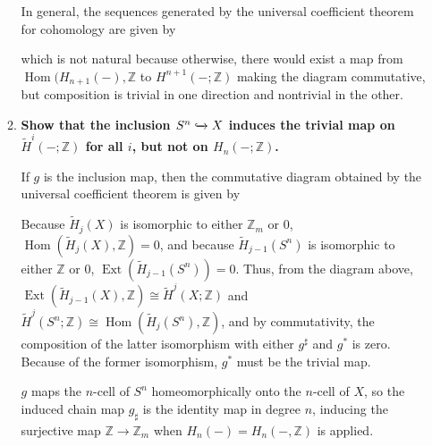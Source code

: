 \documentclass[12pt]{article}
\DeclareMathOperator{\Hom}{Hom}
\DeclareMathOperator{\Ext}{Ext}
\begin{document}
\begin{enumerate}
\begin{enumerate}
                In general, the sequences generated by the universal coefficient theorem for cohomology are given by
                \begin{center}
                \end{center}
                which is not natural because otherwise, there would exist a map from $\Hom(H_{n + 1}(-), \mathbb{Z}$ to $H^{n + 1}(-; \mathbb{Z})$ making the diagram commutative, but composition is trivial in one direction and nontrivial in the other.

            \item
                \boldmath\textbf{Show that the inclusion $S^n \xhookrightarrow{} X$ induces the trivial map on $\tilde{H}^i(-; \mathbb{Z})$ for all $i$, but not on $H_n(-; \mathbb{Z})$.
                }\unboldmath \par
                If $g$ is the inclusion map, then the commutative diagram obtained by the universal coefficient theorem is given by
                \begin{center}
                \end{center}
                Because $\tilde{H}_j(X)$ is isomorphic to either $\mathbb{Z}_m$ or 0, $\Hom(\tilde{H}_j(X), \mathbb{Z}) = 0$, and because $\tilde{H}_{j - 1}(S^n)$ is isomorphic to either $\mathbb{Z}$ or 0, $\Ext(\tilde{H}_{j - 1}(S^n)) = 0$. Thus, from the diagram above, $\Ext(\tilde{H}_{j - 1}(X), \mathbb{Z}) \cong \tilde{H}^j(X; \mathbb{Z})$ and $\tilde{H}^j(S^n; \mathbb{Z}) \cong \Hom(\tilde{H}_j(S^n), \mathbb{Z})$, and by commutativity, the composition of the latter isomorphism with either $g^\sharp$ and $g^*$ is zero. Because of the former isomorphism, $g^*$ must be the trivial map. \par
                $g$ maps the $n$-cell of $S^n$ homeomorphically onto the $n$-cell of $X$, so the induced chain map $g_\sharp$ is the identity map in degree $n$, inducing the surjective map $\mathbb{Z} \to \mathbb{Z}_m$ when $H_n(-) = H_n(-, \mathbb{Z})$ is applied.
        \end{enumerate}
\end{enumerate}
\end{document}
